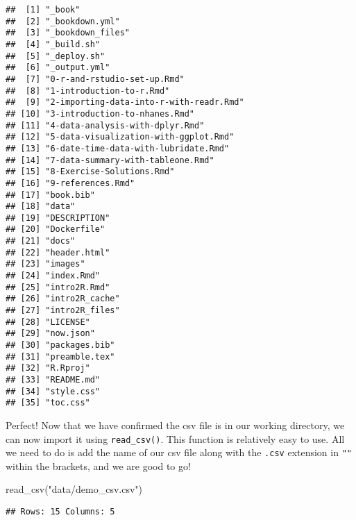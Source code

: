 \documentclass[
]{book}
\newenvironment{Shaded}{\begin{snugshade}}{\end{snugshade}}
\newcommand{\FunctionTok}[1]{\textcolor[rgb]{0.00,0.00,0.00}{#1}}
\newcommand{\NormalTok}[1]{#1}
\newcommand{\StringTok}[1]{\textcolor[rgb]{0.31,0.60,0.02}{#1}}
\begin{document}
\begin{verbatim}
##  [1] "_book"                                 
##  [2] "_bookdown.yml"                         
##  [3] "_bookdown_files"                       
##  [4] "_build.sh"                             
##  [5] "_deploy.sh"                            
##  [6] "_output.yml"                           
##  [7] "0-r-and-rstudio-set-up.Rmd"            
##  [8] "1-introduction-to-r.Rmd"               
##  [9] "2-importing-data-into-r-with-readr.Rmd"
## [10] "3-introduction-to-nhanes.Rmd"          
## [11] "4-data-analysis-with-dplyr.Rmd"        
## [12] "5-data-visualization-with-ggplot.Rmd"  
## [13] "6-date-time-data-with-lubridate.Rmd"   
## [14] "7-data-summary-with-tableone.Rmd"      
## [15] "8-Exercise-Solutions.Rmd"              
## [16] "9-references.Rmd"                      
## [17] "book.bib"                              
## [18] "data"                                  
## [19] "DESCRIPTION"                           
## [20] "Dockerfile"                            
## [21] "docs"                                  
## [22] "header.html"                           
## [23] "images"                                
## [24] "index.Rmd"                             
## [25] "intro2R.Rmd"                           
## [26] "intro2R_cache"                         
## [27] "intro2R_files"                         
## [28] "LICENSE"                               
## [29] "now.json"                              
## [30] "packages.bib"                          
## [31] "preamble.tex"                          
## [32] "R.Rproj"                               
## [33] "README.md"                             
## [34] "style.css"                             
## [35] "toc.css"
\end{verbatim}

Perfect! Now that we have confirmed the csv file is in our working directory, we can now import it using \texttt{read\_csv()}. This function is relatively easy to use. All we need to do is add the name of our csv file along with the \texttt{.csv} extension in \texttt{""} within the brackets, and we are good to go!

\begin{Shaded}
\begin{Highlighting}[]
\FunctionTok{read\_csv}\NormalTok{(}\StringTok{"data/demo\_csv.csv"}\NormalTok{)}
\end{Highlighting}
\end{Shaded}

\begin{verbatim}
## Rows: 15 Columns: 5
\end{verbatim}
\end{document}
